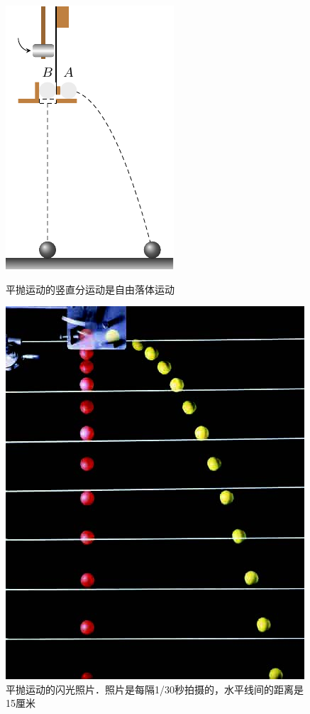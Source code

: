 \begin{figure}[htbp]
    \centering
    \begin{minipage}[b]{0.38\linewidth}
        \centering
        \includegraphics{fig/A/4-9.pdf}
        \caption{平抛运动的竖直分运动是自由落体运动}\label{fig_A_4-9}
    \end{minipage}
    \hfill
    \begin{minipage}[b]{0.57\linewidth}
        \centering
        \includegraphics[scale=0.8]{fig/A/4-10.jpg}
        \caption{平抛运动的闪光照片．照片是每隔1/30秒拍摄的，水平线间的距离是15厘米}\label{fig_A_4-10}
    \end{minipage}
\end{figure}

